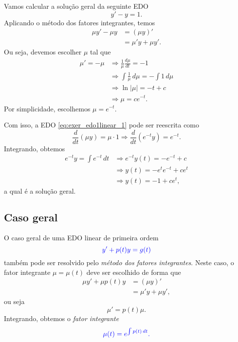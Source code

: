 \begin{ex}
  Vamos calcular a solução geral da seguinte EDO
  \begin{equation}\label{eq:exer_edo1linear_1}
    y' - y = 1. 
  \end{equation}
  Aplicando o método dos fatores integrantes, temos
  \begin{align}
    \mu y' - \mu y &= (\mu y)' \\
                   &= \mu' y + \mu y'.
  \end{align}
  Ou seja, devemos escolher $\mu$ tal que
  \begin{align}
    \mu' = -\mu &\Rightarrow \frac{1}{\mu}\frac{d\mu}{dt} = -1 \\
                &\Rightarrow \int \frac{1}{\mu}\,d\mu = -\int 1\,d\mu \\
                &\Rightarrow \ln|\mu| = -t + c \\
                &\Rightarrow \mu = ce^{-t}.
  \end{align}
  Por simplicidade, escolhemos $\mu = e^{-t}$.

  Com isso, a EDO \eqref{eq:exer_edo1linear_1} pode ser reescrita como
  \begin{equation}
    \frac{d}{dt}\left(\mu y\right) = \mu\cdot 1 \Rightarrow \frac{d}{dt}\left(e^{-t}y\right) = e^{-t}.
  \end{equation}
  Integrando, obtemos
  \begin{align}
    e^{-t}y = \int e^{-t}\,dt &\Rightarrow e^{-t}y(t) = -e^{-t} + c \\
                              &\Rightarrow y(t) = -e^te^{-t} + ce^{t} \\
                              &\Rightarrow y(t) =  -1 + ce^{t},
  \end{align}
  a qual é a solução geral.
\end{ex}

\subsection{Caso geral}

O caso geral de uma EDO linear de primeira ordem
\begin{equation}\label{eq:edo1linear_pg}
  \color{blue}{y' + p(t)y = g(t)}
\end{equation}
também pode ser resolvido pelo \emph{método dos fatores integrantes}. Neste caso, o fator integrante $\mu = \mu(t)$ deve ser escolhido de forma que
\begin{align}
  \mu y' + \mu p(t) y &= (\mu y)' \\
                      &= \mu' y + \mu y',
\end{align}
ou seja
\begin{equation}
  \mu' = p(t)\mu.
\end{equation}
Integrando, obtemos o \emph{fator integrante}
\begin{equation}
  \color{blue}{\mu(t) = e^{\int p(t)\,dt}.}
\end{equation}

